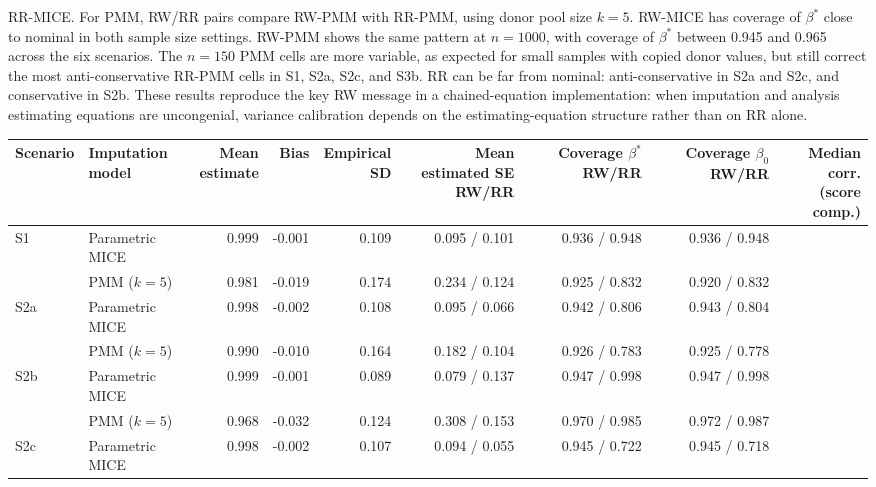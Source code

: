 RR-MICE.  For PMM, RW/RR pairs compare RW-PMM with
RR-PMM, using donor pool size \(k=5\).  RW-MICE has
coverage of \(\beta^\ast\) close to nominal in both sample size
settings.  RW-PMM shows the same pattern at \(n=1000\), with
coverage of \(\beta^\ast\) between 0.945 and 0.965 across the six
scenarios.  The \(n=150\) PMM cells are more variable, as expected for
small samples with copied donor values, but still correct the most
anti-conservative RR-PMM cells in S1, S2a, S2c, and S3b.  RR can be far from nominal: anti-conservative in S2a and S2c, and
conservative in S2b.  These results reproduce the key RW message in a
chained-equation implementation: when imputation and analysis
estimating equations are uncongenial, variance calibration depends on
the estimating-equation structure rather than on RR alone.

\begin{table}[ht]
\centering
\scriptsize
\setlength{\tabcolsep}{3.5pt}
\begin{tabular}{llrrrrrrr}
\toprule
Scenario & \makecell{Imputation\\model} & \makecell{Mean\\estimate} & Bias &
\makecell{Empirical\\SD} &
\makecell{Mean estimated SE\\RW/RR} &
\makecell{Coverage \(\beta^\ast\)\\RW/RR} &
\makecell{Coverage \(\beta_0\)\\RW/RR} & \makecell{Median corr.\\(score comp.)}\\
\midrule
S1  & Parametric MICE & 0.999 & -0.001 & 0.109 & 0.095 / 0.101 & 0.936 / 0.948 & 0.936 / 0.948 &\\
\addlinespace[1pt]
    & PMM (\(k=5\)) & 0.981 & -0.019 & 0.174 & 0.234 / 0.124 & 0.925 / 0.832 & 0.920 / 0.832 &\\
\addlinespace[1pt]
S2a & Parametric MICE & 0.998 & -0.002 & 0.108 & 0.095 / 0.066 & 0.942 / 0.806 & 0.943 / 0.804 &\\
\addlinespace[1pt]
    & PMM (\(k=5\)) & 0.990 & -0.010 & 0.164 & 0.182 / 0.104 & 0.926 / 0.783 & 0.925 / 0.778 &\\
\addlinespace[1pt]
S2b & Parametric MICE & 0.999 & -0.001 & 0.089 & 0.079 / 0.137 & 0.947 / 0.998 & 0.947 / 0.998 &\\
\addlinespace[1pt]
    & PMM (\(k=5\)) & 0.968 & -0.032 & 0.124 & 0.308 / 0.153 & 0.970 / 0.985 & 0.972 / 0.987 &\\
\addlinespace[1pt]
S2c & Parametric MICE & 0.998 & -0.002 & 0.107 & 0.094 / 0.055 & 0.945 / 0.722 & 0.945 / 0.718 &\\

\end{tabular}
\end{table}
